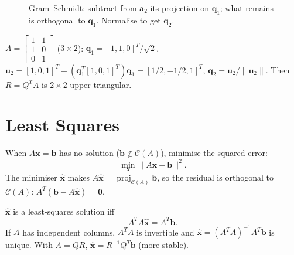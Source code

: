 \begin{figure}[h]
\centering
{}
\caption{Gram--Schmidt: subtract from $\mathbf{a}_2$ its projection on $\mathbf{q}_1$; what remains is orthogonal to $\mathbf{q}_1$. Normalise to get $\mathbf{q}_2$.}
\label{fig:gram-schmidt}
\end{figure}

\begin{example}
$A=\begin{bmatrix}1&1\\1&0\\0&1\end{bmatrix}$ ($3\times2$): $\mathbf{q}_1=[1,1,0]^T/\sqrt2$, $\mathbf{u}_2=[1,0,1]^T-(\mathbf{q}_1^T[1,0,1]^T)\mathbf{q}_1=[1/2,-1/2,1]^T$, $\mathbf{q}_2=\mathbf{u}_2/\|\mathbf{u}_2\|$. Then $R=Q^TA$ is $2\times2$ upper-triangular.
\end{example}

\section{Least Squares}
\label{sec:least-squares}
When $A\mathbf{x}=\mathbf{b}$ has no solution ($\mathbf{b}\notin\mathcal{C}(A)$), minimise the squared error:
\[
  \min_{\mathbf{x}}\|A\mathbf{x}-\mathbf{b}\|^2.
\]
The minimiser $\hat{\mathbf{x}}$ makes $A\hat{\mathbf{x}}=\operatorname{proj}_{\mathcal{C}(A)}\mathbf{b}$, so the residual is orthogonal to $\mathcal{C}(A)$: $A^T(\mathbf{b}-A\hat{\mathbf{x}})=\mathbf{0}$.

\begin{theorem}
$\hat{\mathbf{x}}$ is a least-squares solution iff
\[
  A^TA\hat{\mathbf{x}}=A^T\mathbf{b}.
\]
If $A$ has independent columns, $A^TA$ is invertible and $\hat{\mathbf{x}}=(A^TA)^{-1}A^T\mathbf{b}$ is unique. With $A=QR$, $\hat{\mathbf{x}}=R^{-1}Q^T\mathbf{b}$ (more stable).
\end{theorem}

